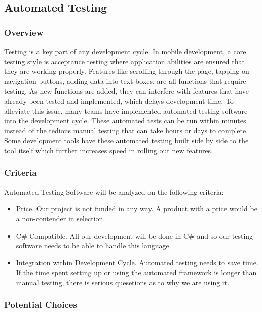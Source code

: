 \documentclass[onecolumn, draftclsnofoot,10pt, compsoc]{IEEEtran}
\begin{document}
\subsection{Automated Testing}
\subsubsection{Overview}
Testing is a  key part of any development cycle. In mobile development, a core testing style is acceptance testing where application abilities are ensured that they are working properly. Features like scrolling through
the page, tapping on navigation buttons, adding data into text boxes, are all functions that require testing. As new functions are added, they can interfere with features that have already been tested and  implemented, which
delays development time. To alleviate this issue, many teams have implemented automated  testing software into the development cycle. These automated  tests can  be run within minutes instead of the tedious manual  testing that
can take hours or days to complete. Some development tools have these automated testing built side by side to the tool itself which further increases speed in rolling out new features.

\subsubsection{Criteria}
Automated Testing Software will be analyzed on the following criteria:
\begin{itemize}
   	\item Price. Our project is not funded in any way. A product with a price would be a non-contender in selection.
	\item C\# Compatible. All our development will be done in C\# and so our testing software needs to be able to handle this  language.
	\item Integration within Development Cycle. Automated testing needs to save time. If the time spent setting up or using the automated framework is longer than manual testing, there is serious quesetions as to why  we are using it.
\end{itemize}
\subsubsection{Potential Choices}
\end{document}
